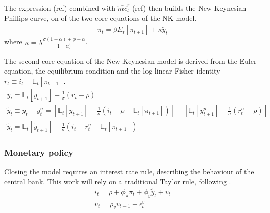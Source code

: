 \documentclass[12pt,a4paper,english]{article} %
\newcommand{\E}{\mathbb{E}} %
\begin{document}
	The expression (ref) combined with $\hat{mc}_t^r$ (ref) then builds the New-Keynesian Phillips curve, on of the two core equations of the NK model.
	\begin{equation}
		\begin{aligned}
			\pi_t = \beta E_t [\pi_{t+1}] + \kappa \tilde{y}_t
		\end{aligned}
	\end{equation}
	where $\kappa = \lambda \frac{\sigma (1 - \alpha) + \phi + \alpha}
	{1 - \alpha)}$.
	
	The second core equation of the New-Keynesian model is derived from the Euler equation, the equilibrium condition and the log linear Fisher identity $r_t \equiv i_t - \E_t[\pi_{t+1}]$.
	\begin{equation}
		\begin{aligned}
			y_t = \E_t[y_{t+1}] - \frac{1}{\sigma} (r_t - \rho) \\
			\tilde{y}_t \equiv y_t - y_t^n = 
			\left[
			\E_t[y_{t+1}] - \frac{1}{\sigma} (i_t - \rho - \E_t[\pi_{t+1}])
			\right]
			-
			\left[
			\E_t[y_{t+1}^n] - \frac{1}{\sigma} (r_t^n - \rho)
			\right]\\
			\tilde{y}_t = \E_t[\tilde{y}_{t+1}] - \frac{1}{\sigma} (i_t - r_t^n - \E_t[\pi_{t+1}])
		\end{aligned}
	\end{equation}
	
	\subsubsection{Monetary policy}
	
	Closing the model requires an interest rate rule, describing the behaviour of the central bank. This work will rely on a traditional Taylor rule, following \cite{gali_monetary_2008}.
	\begin{equation}
		\begin{aligned}
			i_t = \rho + \phi_{\pi} \pi_t + \phi_{y} \tilde{y}_t + v_t \\
			v_t = \rho_v v_{t-1} + \epsilon_t^v
		\end{aligned}
	\end{equation}
\end{document}
